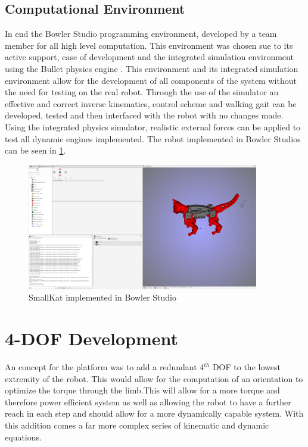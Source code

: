\documentclass[12pt]{report}
\begin{document}
\section{Computational Environment}
In end the Bowler Studio programming environment\cite{BowlerStudio}, developed by a team member for all high level computation. This environment was chosen sue to its active support, ease of development and the integrated simulation environment using the Bullet physics engine \cite{Coumans:2015:BPS:2776880.2792704}. This environment and its integrated simulation environment allow for the development of all components of the system without the need for testing on the real robot. Through the use of the simulator an effective and correct inverse kinematics, control scheme and walking gait can be developed, tested and then interfaced with the robot with no changes made. Using the integrated physics simulator, realistic external forces can be applied to test all dynamic engines implemented. The robot implemented in Bowler Studios can be seen in \ref{fig:Bowler}.
\begin{figure}[H]
    \centering
    \includegraphics[width=0.9\textwidth]{Images/bowler.png}
    \caption{SmallKat implemented in Bowler Studio}
    \label{fig:Bowler}
\end{figure}


\chapter{4-DOF Development}\label{chap:4Dof}
An concept for the platform was to add a redundant 4$^{th}$ DOF to the lowest extremity of the robot. This would allow for the computation of an orientation to optimize the torque through the limb.This will allow for a more torque and therefore power efficient system as well as allowing the robot to have a further reach in each step and should allow for a more dynamically capable system. With this addition comes a far more complex series of kinematic and dynamic equations.
\end{document}
